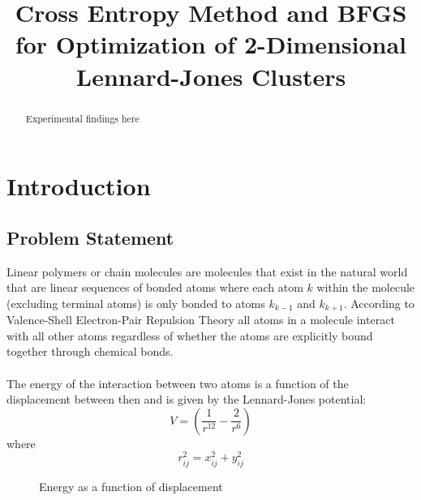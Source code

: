 \documentclass[conference,letterpaper]{IEEEtran}
\begin{document}
\title{Cross Entropy Method and BFGS for Optimization of 2-Dimensional Lennard-Jones Clusters}
\author{
}

\maketitle

\begin{abstract}
    Experimental findings here
\end{abstract}

%
%   
\section{Introduction}
\subsection{Problem Statement}
\par
Linear polymers or chain molecules are molecules that exist in the natural world that are linear sequences of bonded atoms where each atom $k$ within the molecule (excluding terminal atoms) is only bonded to atoms $k_{k - 1}$ and $k_{k + 1}$. According to Valence-Shell Electron-Pair Repulsion Theory all atoms in a molecule interact with all other atoms regardless of whether the atoms are explicitly bound together through chemical bonds.
\\\\
The energy of the interaction between two atoms is a function of the displacement between then and is given by the Lennard-Jones potential:
\begin{equation}
    V = (\frac{1}{r^{12}} - \frac{2}{r^{6}})
\end{equation}
where
\begin{equation}
    r^{2}_{ij} = x^{2}_{ij} + y^{2}_{ij}
\end{equation}

\begin{figure}[h]
    \caption{Energy as a function of displacement}
    \label{energy}
\end{figure}
\end{document}
